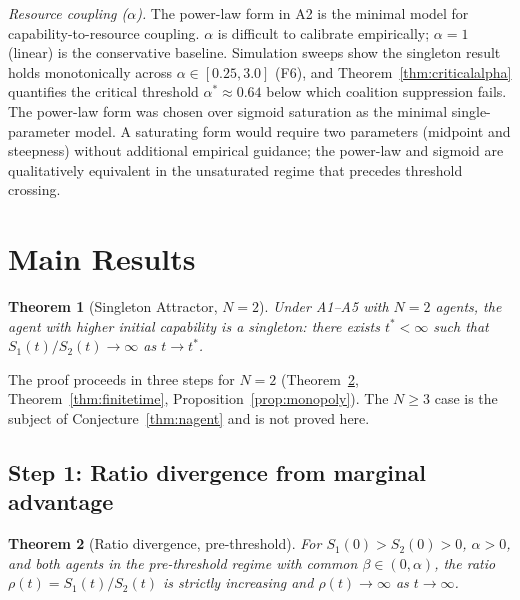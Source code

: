 \documentclass[11pt,letterpaper]{article}
\theoremstyle{plain}
\newtheorem{theorem}{Theorem}[section]
\theoremstyle{definition}
\theoremstyle{remark}
\newcommand{\tstar}{t^{*}}
\begin{document}
\noindent\textit{Resource coupling ($\alpha$).}
The power-law form in A2 is the minimal model for capability-to-resource
coupling.
$\alpha$ is difficult to calibrate empirically; $\alpha = 1$ (linear)
is the conservative baseline.
Simulation sweeps show the singleton result holds monotonically across
$\alpha \in [0.25, 3.0]$ (F6), and Theorem~\ref{thm:criticalalpha} quantifies
the critical threshold $\alpha^* \approx 0.64$ below which coalition suppression
fails.
The power-law form was chosen over sigmoid saturation as the minimal
single-parameter model.
A saturating form would require two parameters (midpoint and steepness)
without additional empirical guidance; the power-law and sigmoid are
qualitatively equivalent in the unsaturated regime that precedes threshold
crossing.

\section{Main Results}
\label{sec:theorems}

\begin{theorem}[Singleton Attractor, $N=2$]
\label{thm:singleton}
Under A1--A5 with $N = 2$ agents, the agent with higher initial
capability is a singleton: there exists $\tstar < \infty$ such that
$S_1(t)/S_2(t) \to \infty$ as $t \to \tstar$.
\end{theorem}

The proof proceeds in three steps for $N = 2$
(Theorem~\ref{thm:ratio}, Theorem~\ref{thm:finitetime},
Proposition~\ref{prop:monopoly}).
The $N \geq 3$ case is the subject of Conjecture~\ref{thm:nagent} and
is not proved here.

\subsection{Step 1: Ratio divergence from marginal advantage}
\label{sec:step1}

\begin{theorem}[Ratio divergence, pre-threshold]
\label{thm:ratio}
For $S_1(0) > S_2(0) > 0$, $\alpha > 0$, and both agents in the
pre-threshold regime with common $\beta \in (0, \alpha)$,
the ratio $\rho(t) = S_1(t)/S_2(t)$ is strictly increasing and
$\rho(t) \to \infty$ as $t \to \infty$.
\end{theorem}
\end{document}
